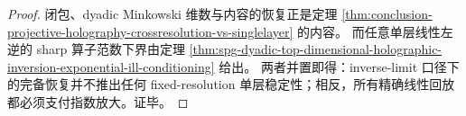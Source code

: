 \begin{proof}
闭包、dyadic Minkowski 维数与内容的恢复正是定理 \ref{thm:conclusion-projective-holography-crossresolution-vs-singlelayer} 的内容。
而任意单层线性左逆的 sharp 算子范数下界由定理 \ref{thm:spg-dyadic-top-dimensional-holographic-inversion-exponential-ill-conditioning} 给出。
两者并置即得：inverse-limit 口径下的完备恢复并不推出任何 fixed-resolution 单层稳定性；相反，所有精确线性回放都必须支付指数放大。证毕。
\end{proof}
